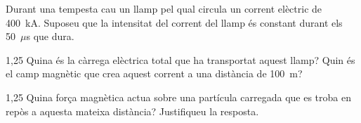Durant una tempesta cau un llamp pel qual circula un corrent elèctric de 400~kA. Suposeu que la intensitat del corrent del llamp és constant durant els 50~$\mu$s que dura.

\begin{apartat}{1,25}
Quina és la càrrega elèctrica total que ha transportat aquest llamp? Quin és el camp magnètic que crea aquest corrent a una distància de 100~m?
\end{apartat}

\begin{apartat}{1,25}
Quina força magnètica actua sobre una partícula carregada que es troba en repòs a aquesta mateixa distància? Justifiqueu la resposta.
\end{apartat}

